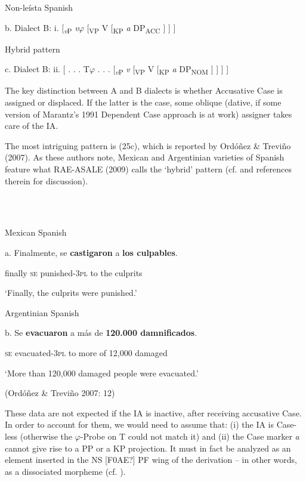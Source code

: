 \documentclass[output=paper]{langsci/langscibook}
\begin{document}
Non-leísta Spanish

b.  Dialect B:  i.  [\textit{\textsubscript{v}}\textsubscript{P} \textit{v}$\varphi $ [\textsubscript{VP} V [\textsubscript{KP} \textit{a} DP\textsubscript{ACC} ] ] ]

 

Hybrid pattern

  c.  Dialect B:  ii.   [ . . . T$\varphi $ . . . [\textit{\textsubscript{v}}\textsubscript{P} \textit{v} [\textsubscript{VP} V [\textsubscript{KP} \textit{a} DP\textsubscript{NOM} ] ] ] ]

 

The key distinction between A and B dialects is whether Accusative Case is assigned or displaced. If the latter is the case, some oblique (dative, if some version of Marantz’s 1991 Dependent Case approach is at work) assigner takes care of the IA.

The most intriguing pattern is (25c), which is reported by Ordóñez \& Treviño (2007). As these authors note, Mexican and Argentinian varieties of Spanish feature what RAE-ASALE (2009) calls the ‘hybrid’ pattern (cf. \citealt{Planells2017} and references therein for discussion).

\ea%
    \label{ex:key:26}
    \gll\\
        \\
    \glt
    \z

          Mexican Spanish

a.   Finalmente, se  \textbf{castigaron}       a  \textbf{los culpables}.        

      finally         \textsc{se}   punished-\textsc{3pl}   to the culprits

‘Finally, the culprits were punished.’

  Argentinian Spanish

b.   Se  \textbf{evacuaron}    a más de \textbf{120.000 damnificados}.              

        \textsc{se}   evacuated-\textsc{3pl} to more of 12,000 damaged

                  ‘More than 120,000 damaged people were evacuated.’

(Ordóñez \& Treviño 2007: 12)

These data are not expected if the IA is inactive, after receiving accusative Case. In order to account for them, we would need to assume that: (i) the IA is Case-less (otherwise the $\varphi $-Probe on T could not match it) and (ii) the Case marker \textit{a} cannot give rise to a PP or a KP projection. It must in fact be analyzed as an element inserted in the NS [F0AE?] PF wing of the derivation – in other words, as a dissociated morpheme (cf. \citet{Halle1993}).
\end{document}
